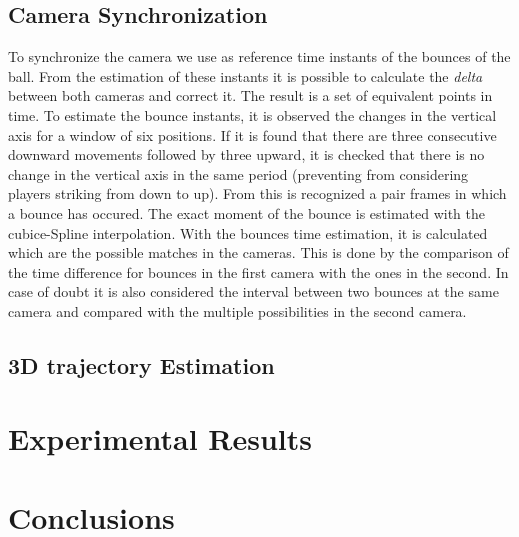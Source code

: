 \documentclass[a4paper]{article}
\begin{document}
\subsection{Camera Synchronization}
To synchronize the camera we use as reference time instants of the bounces of the ball. From the estimation of these instants it is possible to calculate the \textit{delta} between both cameras and correct it. The result is a set of equivalent points in time. 
To estimate the bounce instants, it is observed the changes in the vertical axis for a window of six positions. If it is found that there are three consecutive downward movements followed by three upward, it is checked that there is no change in the vertical axis in the same period (preventing from considering players striking from down to up). From this is recognized a pair frames in which a bounce has occured. The exact moment of the bounce is estimated with the cubice-Spline interpolation.
With the bounces time estimation, it is calculated which are the possible matches in the cameras. This is done by the comparison of the time difference for bounces in the first camera with the ones in the second. In case of doubt it is also considered the interval between two bounces at the same camera and compared with the multiple possibilities in the second camera.  

\subsection{3D trajectory Estimation}


\section{Experimental Results}
\section{Conclusions}
\end{document}
